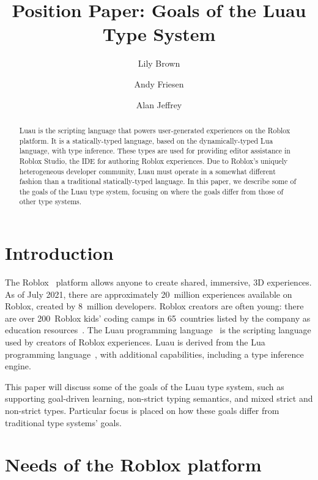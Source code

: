 \documentclass[acmsmall]{acmart}
\begin{document}
\title{Position Paper: Goals of the Luau Type System}

\author{Lily Brown}
\author{Andy Friesen}
\author{Alan Jeffrey}

\begin{abstract}
  Luau is the scripting language that powers user-generated experiences on the
  Roblox platform. It is a statically-typed language, based on the
  dynamically-typed Lua language, with type inference. These types are used for providing
  editor assistance in Roblox Studio, the IDE for authoring Roblox experiences.
  Due to Roblox's uniquely heterogeneous developer community, Luau must operate
  in a somewhat different fashion than a traditional statically-typed language.
  In this paper, we describe some of the goals of the Luau type system,
  focusing on where the goals differ from those of other type systems.
\end{abstract}

\maketitle

\section{Introduction}

The Roblox~\cite{Roblox} platform allows anyone to create shared,
immersive, 3D experiences.  As of July 2021, there are
approximately 20~million experiences available on Roblox, created
by 8~million developers.  Roblox creators are often young: there are
over 200~Roblox kids' coding camps in 65~countries
listed by the company as education resources~\cite{AllEducators}.
The Luau programming language~\cite{Luau} is the scripting language
used by creators of Roblox experiences. Luau is derived from the Lua
programming language~\cite{Lua}, with additional capabilities,
including a type inference engine.

This paper will discuss some of the goals of the Luau type system, such
as supporting goal-driven learning, non-strict typing semantics, and
mixed strict and non-strict types.  Particular focus is placed on how
these goals differ from traditional type systems' goals.

\section{Needs of the Roblox platform}
\end{document}
